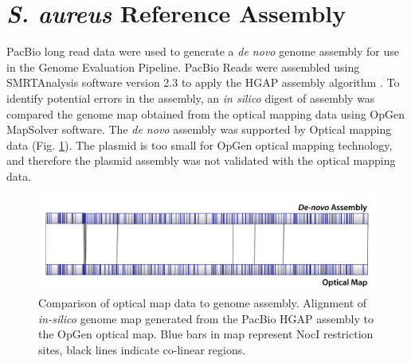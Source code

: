 \documentclass{article}\usepackage[]{graphicx}\usepackage[]{color}
\begin{document}
\section{\emph{S. aureus} Reference Assembly}
PacBio long read data were used to generate a \emph{de novo} genome assembly for use in the Genome Evaluation Pipeline. PacBio Reads were assembled using SMRTAnalysis software version 2.3  to apply the HGAP assembly algorithm \cite{Koren2013}.  To identify potential errors in the assembly, an \emph{in silico} digest of assembly was compared the genome map obtained from the optical mapping data using OpGen MapSolver software. The \emph{de novo} assembly was supported by Optical mapping data (Fig. \ref{fig:opgenCompFig}). The plasmid is too small for OpGen optical mapping technology, and therefore the plasmid assembly was not validated with the optical mapping data. 

\begin{figure}
\includegraphics[width=\textwidth]{opgen_assembly_comparison.png}
\caption{Comparison of optical map data to genome assembly. Alignment of \emph{in-silico} genome map generated from the PacBio HGAP assembly to the OpGen optical map.  Blue bars in map represent NocI restriction sites, black lines indicate co-linear regions.}
\label{fig:opgenCompFig}
\end{figure}

\printbibliography
\end{document}

